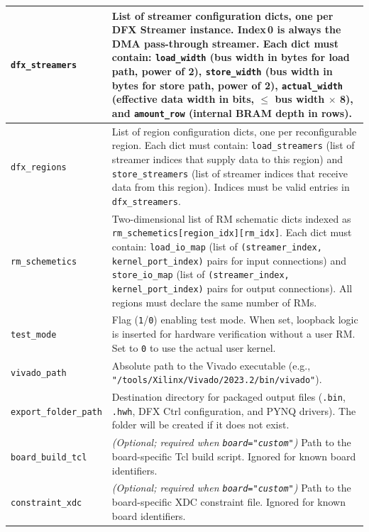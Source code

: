 \documentclass{cernatsnote}
\begin{document}
\begin{longtable}{|l|p{11cm}|}
\hline
\texttt{dfx\_streamers} & List of streamer configuration dicts, one per DFX Streamer instance. Index\,0 is always the DMA pass-through streamer. Each dict must contain: \texttt{load\_width} (bus width in bytes for load path, power of 2), \texttt{store\_width} (bus width in bytes for store path, power of 2), \texttt{actual\_width} (effective data width in bits, $\leq$ bus width $\times$ 8), and \texttt{amount\_row} (internal BRAM depth in rows). \\
\hline
\texttt{dfx\_regions} & List of region configuration dicts, one per reconfigurable region. Each dict must contain: \texttt{load\_streamers} (list of streamer indices that supply data to this region) and \texttt{store\_streamers} (list of streamer indices that receive data from this region). Indices must be valid entries in \texttt{dfx\_streamers}. \\
\hline
\texttt{rm\_schemetics} & Two-dimensional list of RM schematic dicts indexed as \texttt{rm\_schemetics[region\_idx][rm\_idx]}. Each dict must contain: \texttt{load\_io\_map} (list of \texttt{(streamer\_index, kernel\_port\_index)} pairs for input connections) and \texttt{store\_io\_map} (list of \texttt{(streamer\_index, kernel\_port\_index)} pairs for output connections). All regions must declare the same number of RMs. \\
\hline
\texttt{test\_mode} & Flag (\texttt{1}/\texttt{0}) enabling test mode. When set, loopback logic is inserted for hardware verification without a user RM. Set to \texttt{0} to use the actual user kernel. \\
\hline
\texttt{vivado\_path} & Absolute path to the Vivado executable (e.g., \texttt{"/tools/Xilinx/Vivado/2023.2/bin/vivado"}). \\
\hline
\texttt{export\_folder\_path} & Destination directory for packaged output files (\texttt{.bin}, \texttt{.hwh}, DFX Ctrl configuration, and PYNQ drivers). The folder will be created if it does not exist. \\
\hline
\texttt{board\_build\_tcl} & \textit{(Optional; required when \texttt{board="custom"})} Path to the board-specific Tcl build script. Ignored for known board identifiers. \\
\hline
\texttt{constraint\_xdc} & \textit{(Optional; required when \texttt{board="custom"})} Path to the board-specific XDC constraint file. Ignored for known board identifiers. \\
\hline
\end{longtable}
 
\end{document}
